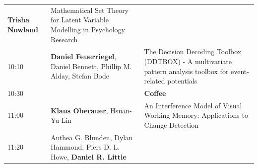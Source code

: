 \documentclass[]{article}
\begin{document}
\begin{longtable}[]{@{}lll@{}}
\begin{minipage}[t]{0.35\columnwidth}
\textbf{Trisha Nowland}\strut
\end{minipage} & \begin{minipage}[t]{0.53\columnwidth}\raggedright\strut
Mathematical Set Theory for Latent Variable Modelling in Psychology
Research\strut
\end{minipage}\tabularnewline
\begin{minipage}[t]{0.03\columnwidth}\raggedright\strut
10:10\strut
\end{minipage} & \begin{minipage}[t]{0.35\columnwidth}\raggedright\strut
\textbf{Daniel Feuerriegel}, Daniel Bennett, Phillip M. Alday, Stefan
Bode\strut
\end{minipage} & \begin{minipage}[t]{0.53\columnwidth}\raggedright\strut
The Decision Decoding Toolbox (DDTBOX) - A multivariate pattern analysis
toolbox for event-related potentials\strut
\end{minipage}\tabularnewline
\begin{minipage}[t]{0.03\columnwidth}\raggedright\strut
10:30\strut
\end{minipage} & \begin{minipage}[t]{0.35\columnwidth}\raggedright\strut
\strut
\end{minipage} & \begin{minipage}[t]{0.53\columnwidth}\raggedright\strut
\textbf{Coffee}\strut
\end{minipage}\tabularnewline
\begin{minipage}[t]{0.03\columnwidth}\raggedright\strut
11:00\strut
\end{minipage} & \begin{minipage}[t]{0.35\columnwidth}\raggedright\strut
\textbf{Klaus Oberauer}, Hsuan-Yu Lin\strut
\end{minipage} & \begin{minipage}[t]{0.53\columnwidth}\raggedright\strut
An Interference Model of Visual Working Memory: Applications to Change
Detection\strut
\end{minipage}\tabularnewline
\begin{minipage}[t]{0.03\columnwidth}\raggedright\strut
11:20\strut
\end{minipage} & \begin{minipage}[t]{0.35\columnwidth}\raggedright\strut
Anthea G. Blunden, Dylan Hammond, Piers D. L. Howe, \textbf{Daniel R.
Little}\strut
\end{minipage} & \begin{minipage}[t]{0.53\columnwidth}\raggedright\strut

\end{minipage}
\end{longtable}
\end{document}
